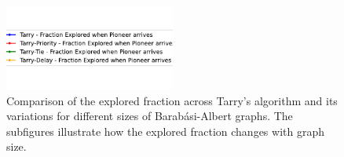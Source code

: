 \begin{figure}[H]
    \centering
    \qquad
    \qquad
    \includegraphics[width=0.5\textwidth]{Cap3/tarry_var_fraction_legend.pdf}
    \newline 
    \qquad
    \newline 
    \qquad
    \caption{Comparison of the explored fraction across Tarry's algorithm and its variations for different sizes of Barabási-Albert graphs. The subfigures illustrate how the explored fraction changes with graph size.} 
    \label{fig_tarry_fraction_all_sizes_barabasi} 
\end{figure}

